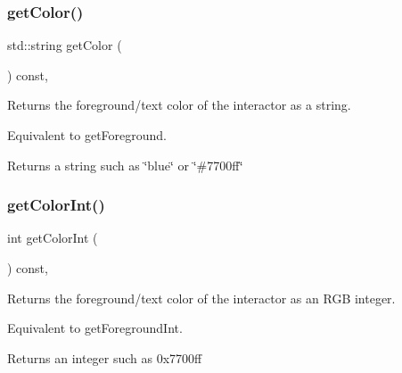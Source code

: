 \mbox{\label{classGInteractor_aa061dfa488c31e18549d64363c1d0e34}} 
\subsubsection{\texorpdfstring{get\+Color()}{getColor()}}
{\footnotesize\ttfamily std\+::string get\+Color (\begin{DoxyParamCaption}{ }\end{DoxyParamCaption}) const\hspace{0.3cm}{\ttfamily [virtual]}, {\ttfamily [inherited]}}



Returns the foreground/text color of the interactor as a string. 

Equivalent to get\+Foreground. \begin{DoxyReturn}{Returns}
a string such as \char`\"{}blue\char`\"{} or \char`\"{}\#7700ff\char`\"{} 
\end{DoxyReturn}
\mbox{\label{classGInteractor_a9635c7af766cdc3417f346683fa0e6c1}} 
\subsubsection{\texorpdfstring{get\+Color\+Int()}{getColorInt()}}
{\footnotesize\ttfamily int get\+Color\+Int (\begin{DoxyParamCaption}{ }\end{DoxyParamCaption}) const\hspace{0.3cm}{\ttfamily [virtual]}, {\ttfamily [inherited]}}



Returns the foreground/text color of the interactor as an R\+GB integer. 

Equivalent to get\+Foreground\+Int. \begin{DoxyReturn}{Returns}
an integer such as 0x7700ff 
\end{DoxyReturn}
\mbox{\label{classGTable_a31ffc9e14dda3e91d1a1b3be81a42db8}} 
